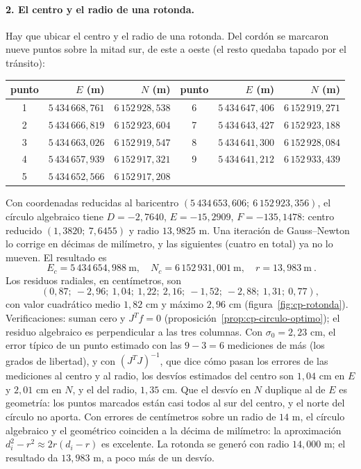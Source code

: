 \paragraph{2. El centro y el radio de una rotonda.} Hay que ubicar el centro y el radio de
una rotonda. Del cordón se marcaron nueve puntos sobre la mitad sur, de este a oeste (el resto
quedaba tapado por el tránsito):
\begin{center}
\small
\begin{tabular}{crr@{\qquad}crr}
\toprule
punto & \(E\) (m) & \(N\) (m) & punto & \(E\) (m) & \(N\) (m)\\
\midrule
1 & \(5\,434\,668{,}761\) & \(6\,152\,928{,}538\) & 6 & \(5\,434\,647{,}406\) & \(6\,152\,919{,}271\)\\
2 & \(5\,434\,666{,}819\) & \(6\,152\,923{,}604\) & 7 & \(5\,434\,643{,}427\) & \(6\,152\,923{,}188\)\\
3 & \(5\,434\,663{,}026\) & \(6\,152\,919{,}547\) & 8 & \(5\,434\,641{,}300\) & \(6\,152\,928{,}084\)\\
4 & \(5\,434\,657{,}939\) & \(6\,152\,917{,}321\) & 9 & \(5\,434\,641{,}212\) & \(6\,152\,933{,}439\)\\
5 & \(5\,434\,652{,}566\) & \(6\,152\,917{,}208\) & & &\\
\bottomrule
\end{tabular}
\end{center}
Con coordenadas reducidas al baricentro \((5\,434\,653{,}606;\ 6\,152\,923{,}356)\), el círculo
algebraico tiene \(D=-2{,}7640\), \(E=-15{,}2909\), \(F=-135{,}1478\): centro reducido
\((1{,}3820;\ 7{,}6455)\) y radio \(13{,}9825\) m. Una iteración de Gauss--Newton lo corrige en
décimas de milímetro, y las siguientes (cuatro en total) ya no lo mueven. El resultado es
\[
  \boxed{\ E_c=5\,434\,654{,}988\ \text{m},\quad N_c=6\,152\,931{,}001\ \text{m},\quad r=13{,}983\ \text{m}\ } .
\]
Los residuos radiales, en centímetros, son
\[
  (0{,}87;\ -2{,}96;\ 1{,}04;\ 1{,}22;\ 2{,}16;\ -1{,}52;\ -2{,}88;\ 1{,}31;\ 0{,}77),
\]
con valor cuadrático medio \(1{,}82\) cm y máximo \(2{,}96\) cm (figura~\ref{fig:cp-rotonda}).
Verificaciones: suman cero y \(J^Tf=0\) (proposición~\ref{prop:cp-circulo-optimo}); el
residuo algebraico es perpendicular a las tres columnas. Con \(\sigma_0=2{,}23\) cm, el error
típico de un punto estimado con las \(9-3=6\) mediciones de más (los grados de libertad), y
con \((J^TJ)^{-1}\), que dice cómo pasan los errores de las mediciones al centro y al radio,
los desvíos estimados del centro son
\(1{,}04\) cm en \(E\) y \(2{,}01\) cm en \(N\), y el del radio, \(1{,}35\) cm. Que el desvío
en \(N\) duplique al de \(E\) es geometría: los puntos marcados están casi todos al sur del
centro, y el norte del círculo no aporta. Con errores de centímetros sobre un radio de
\(14\) m, el círculo algebraico y el geométrico coinciden a la décima de milímetro: la
aproximación \(d_i^2-r^2\approx2r(d_i-r)\) es excelente. La rotonda se generó con radio
\(14{,}000\) m; el resultado da \(13{,}983\) m, a poco más de un desvío.

